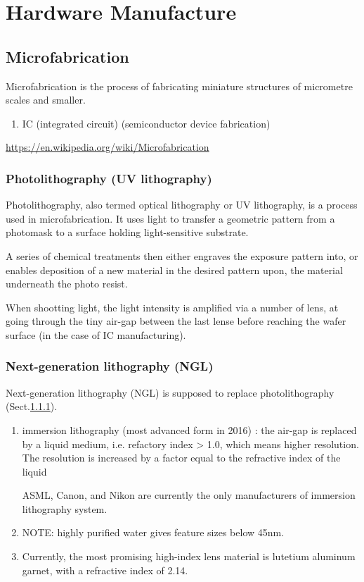 \chapter{Hardware Manufacture}

\section{Microfabrication}

Microfabrication is the process of fabricating miniature structures of
micrometre scales and smaller. 
\begin{enumerate}
  \item IC (integrated circuit) (semiconductor device fabrication)
\end{enumerate}
\url{https://en.wikipedia.org/wiki/Microfabrication}


\subsection{Photolithography (UV lithography)}
\label{sec:photolithography}

Photolithography, also termed optical lithography or UV lithography, is a
process used in microfabrication. It uses light to transfer a geometric pattern
from a photomask to a surface holding light-sensitive substrate.

A series of chemical treatments then either engraves the exposure pattern into,
or enables deposition of a new material in the desired pattern upon, the
material underneath the photo resist.

When shootting light, the light intensity is amplified via a number of lens, at
going through the tiny air-gap between the last lense before reaching the wafer
surface (in the case of IC manufacturing).


\subsection{Next-generation lithography (NGL)}

Next-generation lithography (NGL) is supposed to replace photolithography
(Sect.\ref{sec:photolithography}).

\label{sec:immersion-lithography}
\begin{enumerate}
  \item  immersion lithography (most advanced form in 2016)	: the air-gap is
  replaced by a liquid medium, i.e. refactory index > 1.0, which means higher
  resolution. The resolution is increased by a factor equal to the refractive
  index of the liquid
  
 ASML, Canon, and Nikon are currently the only manufacturers of immersion
 lithography system.

  \item  NOTE: highly purified water gives feature sizes below 45nm.
 
    
  \item Currently, the most promising high-index lens material is lutetium aluminum
  garnet, with a refractive index of 2.14.

\end{enumerate}


